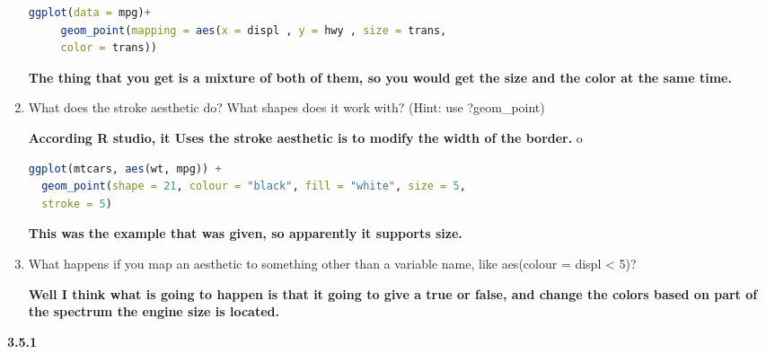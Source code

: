 \documentclass[11pt]{article}
\begin{document}
\begin{enumerate}
    \begin{lstlisting}[language=R]
     ggplot(data = mpg)+
     geom_point(mapping = aes(x = displ , y = hwy , size = trans,
     color = trans))
    \end{lstlisting}
      \textbf{The thing that you get is a mixture of both of them, so you would get the size and the color at the same time. }
      
      \item What does the stroke aesthetic do? What shapes does it work with? (Hint: use ?geom\_point)
      
      \textbf{According R studio, it Uses the stroke aesthetic is to modify the width of the border.}
      o
      \begin{lstlisting}[language=R]
       ggplot(mtcars, aes(wt, mpg)) +
  geom_point(shape = 21, colour = "black", fill = "white", size = 5, 
  stroke = 5)

      \end{lstlisting}
      
\textbf{This was the example that was given, so apparently it supports size.}    

\item What happens if you map an aesthetic to something other than a variable name, like aes(colour = displ < 5)?

\textbf{
Well I think what is going to happen is that it going to give a true or false, and change the colors based on part of the spectrum the engine size is located.}
      \end{enumerate}
     \newpage
     
     
\noindent\textbf{ 3.5.1}     
      
\end{document}
